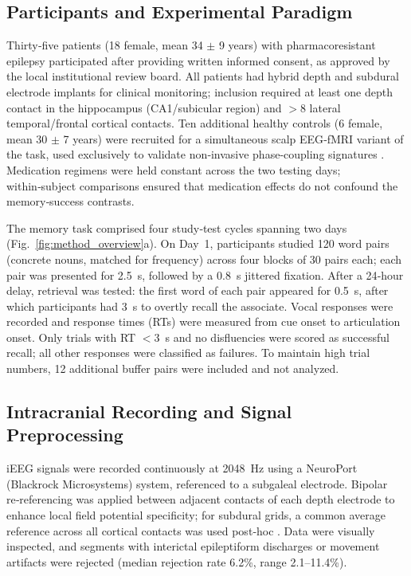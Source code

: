 \documentclass{article}
\begin{document}
\subsection{Participants and Experimental Paradigm}
Thirty‑five patients (18 female, mean 34 $\pm$ 9 years) with pharmacoresistant epilepsy participated after providing written informed consent, as approved by the local institutional review board. All patients had hybrid depth and subdural electrode implants for clinical monitoring; inclusion required at least one depth contact in the hippocampus (CA1/subicular region) and $>$8 lateral temporal/frontal cortical contacts. Ten additional healthy controls (6 female, mean 30 $\pm$ 7 years) were recruited for a simultaneous scalp EEG‑fMRI variant of the task, used exclusively to validate non‑invasive phase‑coupling signatures \cite{barbeau2023,nguyen2024}. Medication regimens were held constant across the two testing days; within‑subject comparisons ensured that medication effects do not confound the memory‑success contrasts.

The memory task comprised four study‑test cycles spanning two days (Fig.~\ref{fig:method_overview}a). On Day~1, participants studied 120 word pairs (concrete nouns, matched for frequency) across four blocks of 30 pairs each; each pair was presented for 2.5~s, followed by a 0.8~s jittered fixation. After a 24‑hour delay, retrieval was tested: the first word of each pair appeared for 0.5~s, after which participants had 3~s to overtly recall the associate. Vocal responses were recorded and response times (RTs) were measured from cue onset to articulation onset. Only trials with RT $<$3~s and no disfluencies were scored as successful recall; all other responses were classified as failures. To maintain high trial numbers, 12 additional buffer pairs were included and not analyzed.

\subsection{Intracranial Recording and Signal Preprocessing}
iEEG signals were recorded continuously at 2048~Hz using a NeuroPort (Blackrock Microsystems) system, referenced to a subgaleal electrode. Bipolar re‑referencing was applied between adjacent contacts of each depth electrode to enhance local field potential specificity; for subdural grids, a common average reference across all cortical contacts was used post‑hoc \cite{parvizi2018}. Data were visually inspected, and segments with interictal epileptiform discharges or movement artifacts were rejected (median rejection rate 6.2\%, range 2.1–11.4\%).
\end{document}
